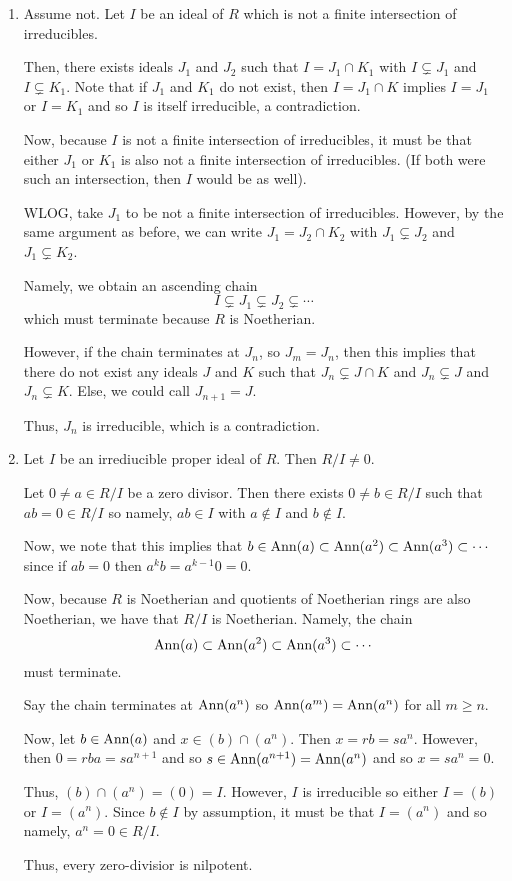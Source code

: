 \documentclass[12pt]{AlgebraQual}
\begin{document}
\begin{solution}$\,$
\begin{enumerate}[label=(\alph*)]
    \item Assume not. Let $I$ be an ideal of $R$ which is not a finite intersection of irreducibles.

    Then, there exists ideals $J_1$ and $J_2$ such that $I=J_1\cap K_1$ with $I\subsetneq J_1$ and $I\subsetneq K_1$. Note that if $J_1$ and $K_1$ do not exist, then $I=J_1\cap K$ implies $I=J_1$ or $I=K_1$ and so $I$ is itself irreducible, a contradiction.

    Now, because $I$ is not a finite intersection of irreducibles, it must be that either $J_1$ or $K_1$ is also not a finite intersection of irreducibles. (If both were such an intersection, then $I$ would be as well).

    WLOG, take $J_1$ to be not a finite intersection of irreducibles. However, by the same argument as before, we can write $J_1=J_2\cap K_2$ with $J_1\subsetneq J_2$ and $J_1\subsetneq K_2$.

    Namely, we obtain an ascending chain $$I\subsetneq J_1\subsetneq J_2\subsetneq\cdots$$ which must terminate because $R$ is Noetherian.

    However, if the chain terminates at $J_n$, so $J_m=J_n$, then this implies that there do not exist any ideals $J$ and $K$ such that $J_n\subsetneq J\cap K$ and $J_n\subsetneq J$ and $J_n\subsetneq K$. Else, we could call $J_{n+1}=J$.

    Thus, $J_n$ is irreducible, which is a contradiction.
    \item Let $I$ be an irrediucible proper ideal of $R$. Then $R/I\not=0$.

    Let $0\not=a\in R/I$ be a zero divisor. Then there exists $0\not=b\in R/I$ such that $ab=0\in R/I$ so namely, $ab\in I$ with $a\notin I$ and $b\notin I$.

    Now, we note that this implies that $b\in\text{Ann}(a)\subset\text{Ann}(a^2)\subset\text{Ann}(a^3)\subset\cdots$ since if $ab=0$ then $a^kb=a^{k-1}0=0$.

    Now, because $R$ is Noetherian and quotients of Noetherian rings are also Noetherian, we have that $R/I$ is Noetherian. Namely, the chain $$\text{Ann}(a)\subset\text{Ann}(a^2)\subset\text{Ann}(a^3)\subset\cdots$$ must terminate.

    Say the chain terminates at $\text{Ann}(a^n)$ so $\text{Ann}(a^m)=\text{Ann}(a^n)$ for all $m\ge n$.

    Now, let $b\in\text{Ann}(a)$ and $x\in(b)\cap(a^n)$. Then $x=rb=sa^n$. However, then $0=rba=sa^{n+1}$ and so $s\in\text{Ann}(a^{n+1})=\text{Ann}(a^n)$ and so $x=sa^n=0$.

    Thus, $(b)\cap (a^n)=(0)=I$. However, $I$ is irreducible so either $I=(b)$ or $I=(a^n)$. Since $b\notin I$ by assumption, it must be that $I=(a^n)$ and so namely, $a^n=0\in R/I$.

    Thus, every zero-divisior is nilpotent.
\end{enumerate}
\end{solution}
\newpage
\end{document}
